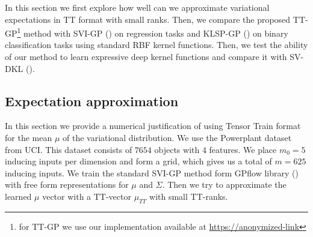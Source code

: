 In this section we first explore how well can we approximate variational
expectations in TT format with small ranks.
Then, we compare the proposed TT-GP\footnote{for TT-GP we use our implementation available at
\url{https://anonymized-link}} method with SVI-GP (\citet{hensman2013}) on regression tasks and KLSP-GP
(\citet{hensman2015}) on binary classification tasks using standard RBF kernel
functions. Then, we test the ability of our method to learn
expressive deep kernel functions and compare it with SV-DKL
(\citet{wilson2016stochastic}).

\subsection{Expectation approximation}

In this section we provide a numerical justification of using Tensor Train
format for the mean $\mu$ of the variational distribution. We use the Powerplant
dataset from UCI. This dataset consists of $7654$ objects with $4$ features. We place 
$m_0 = 5$ inducing inputs per dimension and form a grid, which gives us a total of $m = 625$
inducing inputs. We train the standard SVI-GP method form GPflow library
(\citet{GPflow2016}) with free form representations for $\mu$ and $\Sigma$.
Then we try to approximate the learned $\mu$ vector with a TT-vector 
$\mu_{TT}$ with small TT-ranks. 

